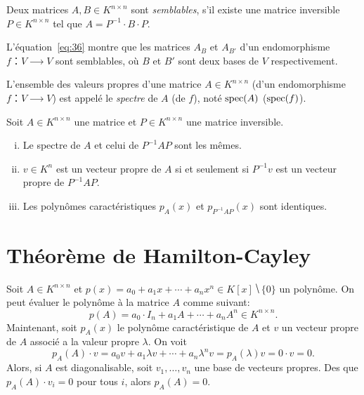 \begin{definition}
  \label{def:42}
  Deux matrices $A,B ∈K^{n×n}$ sont \emph{semblables}, s'il existe une matrice inversible $P ∈ K^{n ×n}$ tel que $A = P^{-1} ⋅B ⋅P$.  
\end{definition}
L'équation~\eqref{eq:36} montre que les matrices $A_B$ et $A_{B'}$ d'un endomorphisme $f：V⟶V$ sont semblables, où $B$ et $B'$ sont deux bases de $V$ respectivement.

\begin{definition}
  \label{def:43}
  L'ensemble des valeurs propres d'une matrice $A ∈ K^{n ×n}$ (d'un endomorphisme $f：V ⟶V$) est appelé le \emph{spectre} de $A$ (de $f$), noté $\operatorname{spec}(A)$ ($\operatorname{spec}(f)$). 
\end{definition}

\begin{theorem}
  \label{thr:46}
  Soit $A ∈ K^{n ×n}$ une matrice et $P ∈ K^{n ×n}$ une matrice inversible.
  \begin{enumerate}[i)]
  \item Le spectre de $A$ et celui de $P^{-1}AP$ sont les mêmes.
  \item $v ∈ K^n$ est un vecteur propre de $A$ si et seulement si $P^{-1} v$  est un vecteur propre de $P^{-1}AP$.
  \item Les polynômes caractéristiques $p_A(x)$ et $p_{P^{-1}AP}(x)$ sont identiques. 
  \end{enumerate}
\end{theorem}


\section{Théorème de Hamilton-Cayley}
\label{sec:theoreme-de-hamilton}


Soit $A ∈ K^{n ×n}$ et $p(x) = a_0 + a_1x + \cdots + a_n x^n ∈ K[x] ⧹\{0\}$ un polynôme. On peut évaluer le polynôme à la matrice $A$ comme suivant:
\begin{displaymath}
  p(A) = a_0 ⋅I_n + a_1 A + \cdots + a_n A^n ∈ K^{n ×n}. 
\end{displaymath}
Maintenant, soit $p_A(x)$ le polynôme caractéristique de $A$ et $v$ un vecteur propre de $A$ associé a la valeur propre $λ$. On voit
\begin{displaymath}
  p_A(A) ⋅v = a_0 v + a_1 λv + \cdots + a_n λ^n v = p_A(λ)v = 0 ⋅v = 0. 
\end{displaymath}
Alors, si $A$ est diagonalisable, soit $v_1,\dots,v_n$ une base de vecteurs propres. Des que   $p_A(A) ⋅v_i = 0$ pour tous $i$, alors $p_A(A) =0$. 

